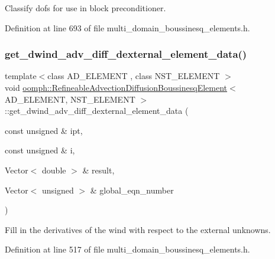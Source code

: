 Classify dofs for use in block preconditioner. 



Definition at line 693 of file multi\+\_\+domain\+\_\+boussinesq\+\_\+elements.\+h.

\mbox{\label{classoomph_1_1RefineableAdvectionDiffusionBoussinesqElement_a560911c835c054a25b5e5d8390cc422c}} 
\subsubsection{\texorpdfstring{get\+\_\+dwind\+\_\+adv\+\_\+diff\+\_\+dexternal\+\_\+element\+\_\+data()}{get\_dwind\_adv\_diff\_dexternal\_element\_data()}}
{\footnotesize\ttfamily template$<$class A\+D\+\_\+\+E\+L\+E\+M\+E\+NT , class N\+S\+T\+\_\+\+E\+L\+E\+M\+E\+NT $>$ \\
void \hyperlink{classoomph_1_1RefineableAdvectionDiffusionBoussinesqElement}{oomph\+::\+Refineable\+Advection\+Diffusion\+Boussinesq\+Element}$<$ A\+D\+\_\+\+E\+L\+E\+M\+E\+NT, N\+S\+T\+\_\+\+E\+L\+E\+M\+E\+NT $>$\+::get\+\_\+dwind\+\_\+adv\+\_\+diff\+\_\+dexternal\+\_\+element\+\_\+data (\begin{DoxyParamCaption}\item[{const unsigned \&}]{ipt,  }\item[{const unsigned \&}]{i,  }\item[{Vector$<$ double $>$ \&}]{result,  }\item[{Vector$<$ unsigned $>$ \&}]{global\+\_\+eqn\+\_\+number }\end{DoxyParamCaption})\hspace{0.3cm}{\ttfamily [inline]}}



Fill in the derivatives of the wind with respect to the external unknowns. 



Definition at line 517 of file multi\+\_\+domain\+\_\+boussinesq\+\_\+elements.\+h.

